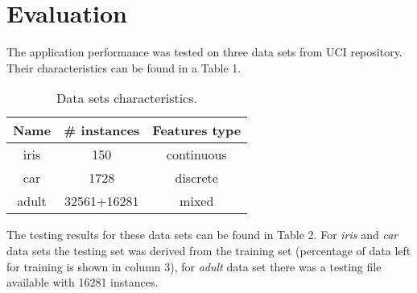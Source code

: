 \documentclass{llncs}
\begin{document}
\section{Evaluation}

The application performance was tested on three data sets from UCI repository. Their characteristics can be found in a Table 1.

\begin{table}
\begin{center}
  \begin{tabular}{ | c | c | c | }
    \hline
    \textbf{Name} & \textbf{\# instances} & \textbf{Features type} \\ \hline
    iris & 150 & continuous \\ \hline
    car & 1728 & discrete \\ \hline
    adult & 32561+16281 & mixed \\
    \hline
  \end{tabular}
  \caption{Data sets characteristics.}
\end{center}
\end{table}

The testing results for these data sets can be found in Table 2. For \emph{iris} and \emph{car} data sets the testing set was derived from the training set (percentage of data left for training is shown in column 3), for \emph{adult} data set there was a testing file available with 16281 instances.  
\end{document}
